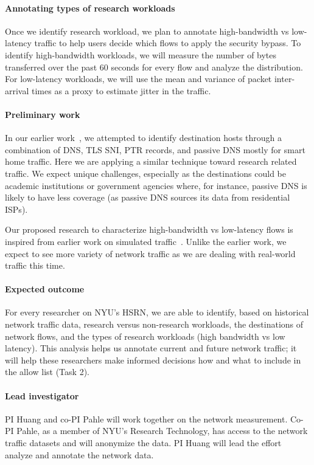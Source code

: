 \paragraph{Annotating types of research workloads}
Once we identify research workload, we plan to annotate high-bandwidth vs low-latency traffic to help users decide which flows to apply the security bypass. To identify high-bandwidth workloads, we will measure the number of bytes transferred over the past 60 seconds for every flow and analyze the distribution. For low-latency workloads, we will use the mean and variance of packet inter-arrival times as a proxy to estimate jitter in the traffic.


\paragraph{Preliminary work}
In our earlier work~\cite{huang2020iot}, we attempted to identify destination hosts through a combination of DNS, TLS SNI, PTR records, and passive DNS mostly for smart home traffic. Here we are applying a similar technique toward research related traffic. We expect unique challenges, especially as the destinations could be academic institutions or government agencies where, for instance, passive DNS is likely to have less coverage (as passive DNS sources its data from residential ISPs).

Our proposed research to characterize high-bandwidth vs low-latency flows is inspired from earlier work on simulated traffic~\cite{huang2013high}. Unlike the earlier work, we expect to see more variety of network traffic as we are dealing with real-world traffic this time.


\paragraph{Expected outcome}
For every researcher on NYU's HSRN, we are able to identify, based on historical network traffic data, research versus non-research workloads, the destinations of network flows, and the types of research workloads (high bandwidth vs low latency). This analysis helps us annotate current and future network traffic; it will help these researchers make informed decisions how and what to include in the allow list (Task 2).

\paragraph{Lead investigator} PI Huang and co-PI Pahle will work together on the network measurement. Co-PI Pahle, as a member of NYU's Research Technology, has access to the network traffic datasets and will anonymize the data. PI Huang will lead the effort analyze and annotate the network data.
